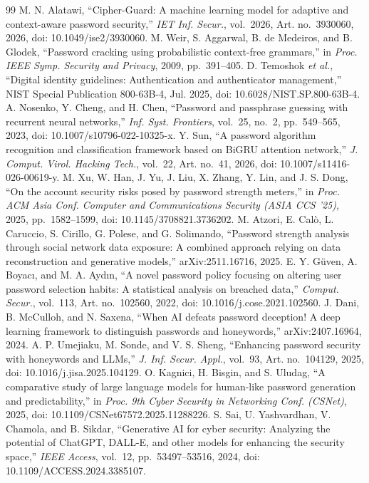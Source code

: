 \documentclass[conference]{IEEEtran}
\begin{document}
\begin{thebibliography}{99}
 M. N. Alatawi, ``Cipher-Guard: A machine learning model for adaptive and context-aware password security,'' \emph{IET Inf. Secur.}, vol.~2026, Art. no.~3930060, 2026, doi: 10.1049/ise2/3930060.
 M. Weir, S. Aggarwal, B. de Medeiros, and B. Glodek, ``Password cracking using probabilistic context-free grammars,'' in \emph{Proc. IEEE Symp. Security and Privacy}, 2009, pp.~391--405.
 D. Temoshok \emph{et al.}, ``Digital identity guidelines: Authentication and authenticator management,'' NIST Special Publication 800-63B-4, Jul. 2025, doi: 10.6028/NIST.SP.800-63B-4.
 A. Nosenko, Y. Cheng, and H. Chen, ``Password and passphrase guessing with recurrent neural networks,'' \emph{Inf. Syst. Frontiers}, vol.~25, no.~2, pp.~549--565, 2023, doi: 10.1007/s10796-022-10325-x.
 Y. Sun, ``A password algorithm recognition and classification framework based on BiGRU attention network,'' \emph{J. Comput. Virol. Hacking Tech.}, vol.~22, Art. no.~41, 2026, doi: 10.1007/s11416-026-00619-y.
 M. Xu, W. Han, J. Yu, J. Liu, X. Zhang, Y. Lin, and J. S. Dong, ``On the account security risks posed by password strength meters,'' in \emph{Proc. ACM Asia Conf. Computer and Communications Security (ASIA CCS '25)}, 2025, pp.~1582--1599, doi: 10.1145/3708821.3736202.
 M. Atzori, E. Cal\`o, L. Caruccio, S. Cirillo, G. Polese, and G. Solimando, ``Password strength analysis through social network data exposure: A combined approach relying on data reconstruction and generative models,'' arXiv:2511.16716, 2025.
 E. Y. G\"uven, A. Boyac\i, and M. A. Ayd\i n, ``A novel password policy focusing on altering user password selection habits: A statistical analysis on breached data,'' \emph{Comput. Secur.}, vol.~113, Art. no.~102560, 2022, doi: 10.1016/j.cose.2021.102560.
 J. Dani, B. McCulloh, and N. Saxena, ``When AI defeats password deception! A deep learning framework to distinguish passwords and honeywords,'' arXiv:2407.16964, 2024.
 A. P. Umejiaku, M. Sonde, and V. S. Sheng, ``Enhancing password security with honeywords and LLMs,'' \emph{J. Inf. Secur. Appl.}, vol.~93, Art. no.~104129, 2025, doi: 10.1016/j.jisa.2025.104129.
 O. Kagnici, H. Bisgin, and S. Uludag, ``A comparative study of large language models for human-like password generation and predictability,'' in \emph{Proc. 9th Cyber Security in Networking Conf. (CSNet)}, 2025, doi: 10.1109/CSNet67572.2025.11288226.
 S. Sai, U. Yashvardhan, V. Chamola, and B. Sikdar, ``Generative AI for cyber security: Analyzing the potential of ChatGPT, DALL-E, and other models for enhancing the security space,'' \emph{IEEE Access}, vol.~12, pp.~53497--53516, 2024, doi: 10.1109/ACCESS.2024.3385107.

\end{thebibliography}
\end{document}
